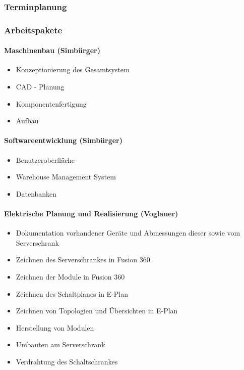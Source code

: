 \newpage
\subsubsection{Terminplanung}

\newpage

\subsubsection{Arbeitspakete}

\paragraph{Maschinenbau (Simbürger)}
\begin{itemize}
    \item Konzeptionierung des Gesamtsystem
    \item CAD - Planung
    \item Komponentenfertigung
    \item Aufbau 
\end{itemize}

\paragraph{Softwareentwicklung (Simbürger)}
\begin{itemize}
    \item Benutzeroberfläche
    \item Warehouse Management System
    \item Datenbanken
\end{itemize}

\paragraph{Elektrische Planung und Realisierung (Voglauer)}
\begin{itemize}
    \item Dokumentation vorhandener Geräte und Abmessungen dieser sowie vom Serverschrank 
    \item Zeichnen des Serverschrankes in Fusion 360
    \item Zeichnen der Module in Fusion 360
    \item Zeichnen des Schaltplanes in E-Plan 
    \item Zeichnen von Topologien und Übersichten in E-Plan 
    \item Herstellung von Modulen 
    \item Umbauten am Serverschrank
    \item Verdrahtung des Schaltschrankes
\end{itemize}





